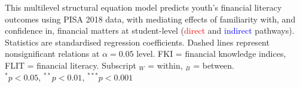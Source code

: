 {
}{This multilevel structural equation model predicts youth's financial literacy outcomes using PISA 2018 data, with mediating effects of familiarity with, and confidence in, financial matters at student-level (\textcolor{red}{direct} and \textcolor{blue}{indirect} pathways). Statistics are standardised regression coefficients. Dashed lines represent nonsignificant relations at $\alpha=0.05$ level. FKI = financial knowledge indices, FLIT = financial literacy. Subscript $_W$ = within, $_B$ = between.\\$^{*}p<0.05$, $^{**}p<0.01$, $^{***}p<0.001$}
